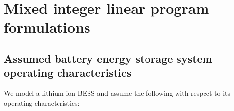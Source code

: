 \documentclass[12pt,a4paper,]{report}
\begin{document}
\appendix
\setcounter{table}{0}
\setcounter{figure}{0}
\renewcommand\thefigure{\thesection.\arabic{figure}} 
\renewcommand\thetable{\thesection.\arabic{table}}

\hypertarget{sec:info-appendix-milps}{%
\section{Mixed integer linear program
formulations}\label{sec:info-appendix-milps}}

\hypertarget{sec:info-appendix-milps-assumptions}{%
\subsection{Assumed battery energy storage system operating
characteristics}\label{sec:info-appendix-milps-assumptions}}

We model a lithium-ion BESS and assume the following with respect to its
operating characteristics:
\end{document}
